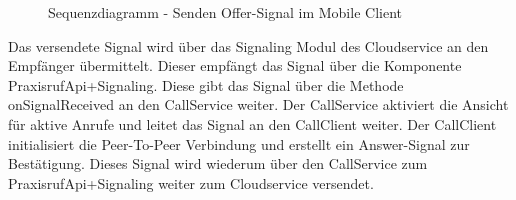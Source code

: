 \begin{figure}[h]
    \centering
    \begin{minipage}[b]{0.9\textwidth}
        \caption{Sequenzdiagramm - Senden Offer-Signal im Mobile Client}
    \end{minipage}
\end{figure}

Das versendete Signal wird über das Signaling Modul des Cloudservice an den Empfänger übermittelt.
Dieser empfängt das Signal über die Komponente PraxisrufApi+Signaling.
Diese gibt das Signal über die Methode onSignalReceived an den CallService weiter.
Der CallService aktiviert die Ansicht für aktive Anrufe und leitet das Signal an den CallClient weiter.
Der CallClient initialisiert die Peer-To-Peer Verbindung und erstellt ein Answer-Signal zur Bestätigung.
Dieses Signal wird wiederum über den CallService zum PraxisrufApi+Signaling weiter zum Cloudservice versendet.

\clearpage
